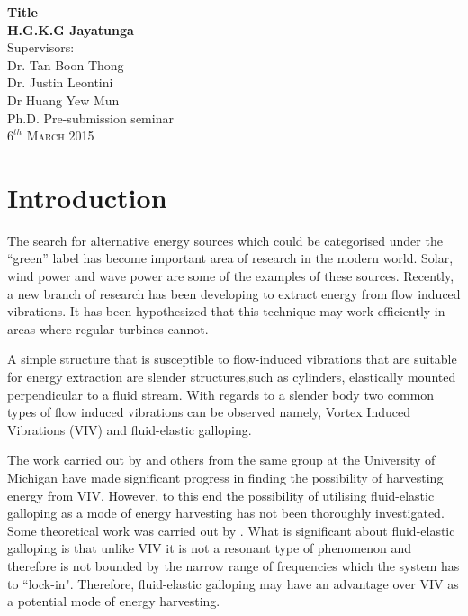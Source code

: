\documentclass[authoryear,12pt]{article}
\begin{document}
\begin{titlepage}
\begin{center}
{\huge \bfseries Title}\\[2.5cm]
{\LARGE \bfseries H.G.K.G Jayatunga}\\[2.5cm]
\Large Supervisors:\\[0.5cm] Dr. Tan Boon Thong \\[0.4cm] Dr. Justin Leontini \\[0.5cm] Dr Huang Yew Mun\\[6.5cm]
\Large Ph.D. Pre-submission seminar\\

\vfill
\textsc{\Large $6^{{th}}$ March 2015}
\end{center}
\end{titlepage}
\tableofcontents
\clearpage
\section{Introduction}
\label{sec:intro}
The search for alternative energy sources which could be categorised under the ``green” label has become important area of research in the modern world. Solar, wind power and wave power are some of the examples of these sources. Recently, a new branch of research has been developing to extract energy from flow induced vibrations. It has been hypothesized that this technique may work efficiently in areas where regular turbines cannot.
 
A simple structure that is susceptible to flow-induced vibrations that are suitable for energy extraction are slender structures,such as cylinders, elastically mounted perpendicular to a fluid stream. With regards to a slender body two common types of flow induced vibrations can be observed namely, Vortex Induced Vibrations (VIV) and fluid-elastic galloping. 

The work carried out by \citet{Bernitsas2008a-concept, Bernitsas2009, Raghavan2010a,Lee2011b} and others from the same group at the University of Michigan have made significant progress in finding the possibility of harvesting energy from VIV. However, to this end the possibility of utilising fluid-elastic galloping as a mode of energy harvesting has not been thoroughly investigated. Some theoretical work was carried out by \cite{Barrero-Gil2010a}. What is significant about fluid-elastic galloping is that unlike VIV it is not a resonant type of phenomenon and therefore is not bounded by the narrow range of frequencies which the system has to ``lock-in". Therefore, fluid-elastic galloping may have an advantage over VIV as a potential mode of energy harvesting. 
\end{document}
